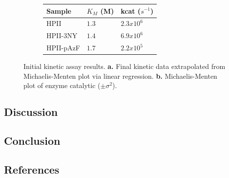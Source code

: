 \documentclass[journal=jacsat,manuscript=article]{achemso}
\begin{document}
\begin{figure}[h!]
  \centering
  \begin{subfigure}{0.29\textwidth}
    \begin{minipage}{0.1\textwidth}\caption{}\end{minipage}%
  \begin{minipage}{.9\textwidth}
    \begin{tabular}{lll}
      \hline
      Sample  & $K_M$ (M) & kcat ($s^{-1}$) \\
      \hline
      HPII        & $1.3$ & $2.3x10^6$\\
      HPII-3NY    & $1.4$ & $6.9x10^6$\\
      HPII-pAzF   & $1.7$ & $2.2x10^5$\\
      \hline
    \end{tabular}
  \end{minipage}
  \end{subfigure}
  \begin{subfigure}{0.69\textwidth}
    \begin{minipage}{0.1\textwidth}\caption{}\end{minipage}%
  \begin{minipage}{.9\textwidth}
  \end{minipage}
  \end{subfigure}
  \caption{Initial kinetic assay results. \textbf{a.} Final kinetic data extrapolated from Michaelis-Menten plot via linear regression. \textbf{b.} Michaelis-Menten plot of enzyme catalytic ($\pm \sigma^2$).}
  \label{fig:bradford-assay}
\end{figure}

\subsection{Discussion}

\subsection{Conclusion}

\subsection{References}

\end{document}
